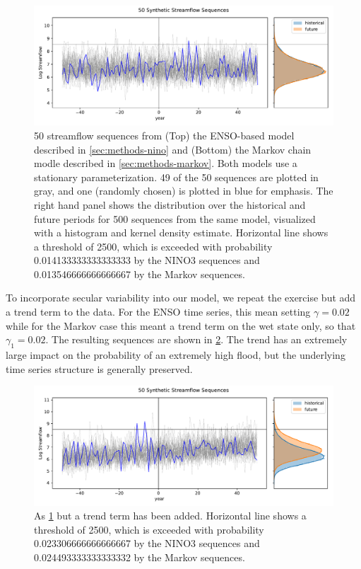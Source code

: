 \documentclass[12pt]{article}
\begin{document}
\begin{figure}[b]
  \includegraphics[width=\textwidth]{stationary_sequences.pdf}  
  \caption{
    50 streamflow sequences from (Top) the ENSO-based model described in \cref{sec:methods-nino} and (Bottom) the Markov chain modle described in \cref{sec:methods-markov}.
    Both models use a stationary parameterization.
    49 of the 50 sequences are plotted in gray, and one (randomly chosen) is plotted in blue for emphasis.
    The right hand panel shows the distribution over the historical and future periods for 500 sequences from the same model, visualized with a histogram and kernel density estimate.
    Horizontal line shows a threshold of \num{2500}, which is exceeded with probability \num{0.014133333333333333} by the NINO3 sequences and \num{0.013546666666666667} by the Markov sequences.\label{fig:stationary-sequences}
  }
\end{figure}

To incorporate secular variability into our model, we repeat the exercise but add a trend term to the data.
For the ENSO time series, this mean setting \(\gamma=0.02\) while for the Markov case this meant a trend term on the wet state only, so that \(\gamma_1=0.02\).
The resulting sequences are shown in \cref{fig:trend-sequences}.
The trend has an extremely large impact on the probability of an extremely high flood, but the underlying time series structure is generally preserved.
\begin{figure}[b]
  \includegraphics[width=\textwidth]{trend_sequences.pdf}
  \caption{
    As \cref{fig:stationary-sequences} but a trend term has been added.
    Horizontal line shows a threshold of \num{2500}, which is exceeded with probability \num{0.023306666666666667} by the NINO3 sequences and \num{0.024493333333333332} by the Markov sequences.\label{fig:trend-sequences}
  }
\end{figure}
\end{document}

